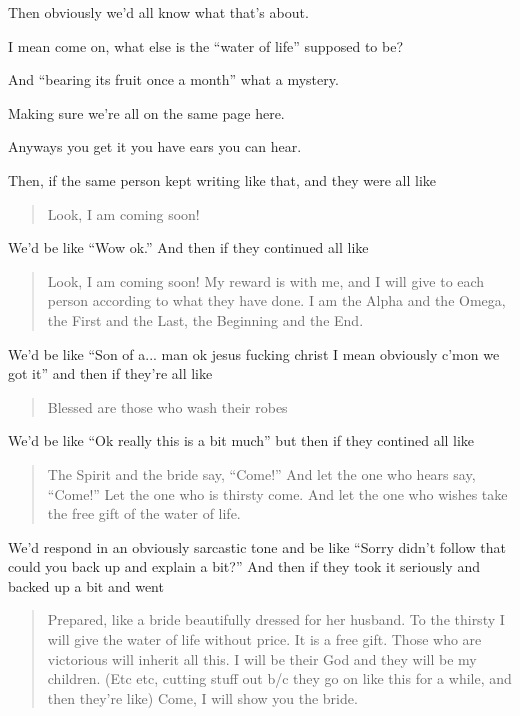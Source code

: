 {{		%

		Then obviously we'd all know what that's about.

		I mean come on, what else is the ``water of life'' supposed to be?

		And ``bearing its fruit once a month'' what a mystery.

		Making sure we're all on the same page here.

		Anyways you get it you have ears you can hear.

		Then, if the same person kept writing like that, and they were all like

		\begin{quote}
		Look, I am coming soon!
		\end{quote}

		We'd be like ``Wow ok.'' And then if they continued all like

		\begin{quote}
		Look, I am coming soon! My reward is with me, and I will give to each person according to what they have done.
		I am the Alpha and the Omega, the First and the Last, the Beginning and the End.
		\end{quote}

		We'd be like ``Son of a... man ok jesus fucking christ I mean obviously c'mon we got it'' and then if they're all like

		\begin{quote}
		Blessed are those who wash their robes
		\end{quote}

		We'd be like ``Ok really this is a bit much'' but then if they contined all like

		\begin{quote}
		The Spirit and the bride say, ``Come!'' And let the one who hears say, ``Come!''
		Let the one who is thirsty come.
		And let the one who wishes take the free gift of the water of life.
		\end{quote}

		We'd respond in an obviously sarcastic tone and be like ``Sorry didn't follow that could you back up and explain a bit?'' And then if they took it seriously and backed up a bit and went

		\begin{quote}
		Prepared, like a bride beautifully dressed for her husband.
		To the thirsty I will give the water of life without price.
		It is a free gift.
		Those who are victorious will inherit all this.
		I will be their God and they will be my children.
		(Etc etc, cutting stuff out b/c they go on like this for a while, and then they're like)
		Come, I will show you the bride.
		\end{quote}

}}
